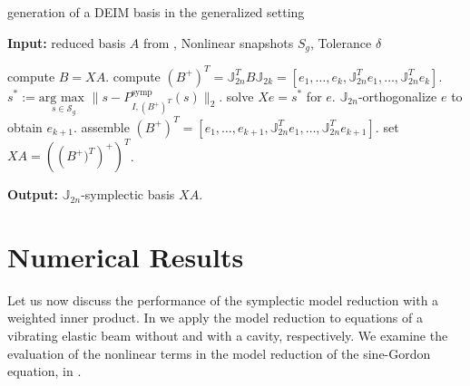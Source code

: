 \begin{algorithm} 
	\caption{generation of a DEIM basis in the generalized setting} \label{alg:5.2}
	\textbf{Input:} reduced basis $A$ from , Nonlinear snapshots $S_g$, Tolerance $\delta$
	\begin{algorithmic} [1]
		\State compute $B=XA$.
		\State compute $(B^+)^T = \mathbb J_{2n}^T B \mathbb J_{2k} = [e_1,\dots ,e_{k} , \mathbb J_{2n}^Te_1,\dots, \mathbb J_{2n}^Te_{k}]$.
			\State $s^* := \underset{s\in \mathcal S_g}{\text{arg\ max }} \| s - P_{I,(B^+)^T}^{\text{symp}} (s)  \|_2$.
			\State solve $Xe = s^*$ for $e$.
			\State $\mathbb J_{2n}$-orthogonalize $e$ to obtain $e_{k+1}$.
			\State assemble $(B^+)^T = [e_1,\dots ,e_{k+1} , \mathbb J_{2n}^Te_1,\dots, \mathbb J_{2n}^Te_{k+1}]$.
		\EndWhile
		\State set $XA = \left( \left (B^+)^T \right)^+ \right)^T$.
	\end{algorithmic}
	\vspace{0.5cm}
	\textbf{Output:} $\mathbb J_{2n}$-symplectic basis $XA$.
\end{algorithm}









\section{Numerical Results} \label{sec:res}
Let us now discuss the performance of the symplectic model reduction with a weighted inner product. In  we apply the model reduction to equations of a vibrating elastic beam without and with a cavity, respectively. We examine the evaluation of the nonlinear terms in the model reduction of the sine-Gordon equation, in .

